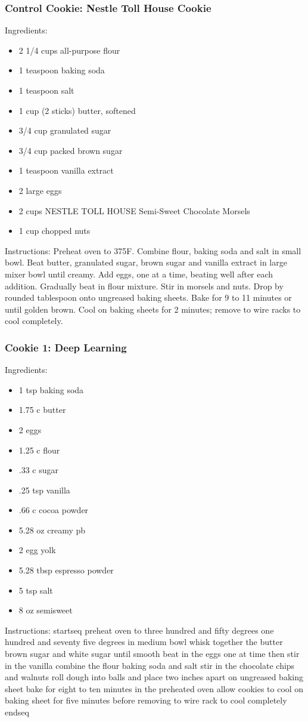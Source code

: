 \documentclass[11pt, a4paper]{article}
\begin{document}
		\subsubsection*{Control Cookie: Nestle\textsuperscript{\textregistered} Toll House\textsuperscript{\textregistered} Cookie}
		Ingredients:
			\begin{multicols}{2}
			\begin{itemize}
				\item2 1/4 cups all-purpose flour
				\item1 teaspoon baking soda
				\item1 teaspoon salt
				\item1 cup (2 sticks) butter, softened
				\item3/4 cup granulated sugar
				\item3/4 cup packed brown sugar
				\item1 teaspoon vanilla extract
				\item2 large eggs
				\item2 cups NESTLE\textsuperscript{\textregistered} TOLL HOUSE\textsuperscript{\textregistered}  Semi-Sweet Chocolate Morsels
				\item1 cup chopped nuts
			\end{itemize}
		\end{multicols}
		Instructions: Preheat oven to 375\textdegree F. Combine flour, baking soda and salt in small bowl. Beat butter, granulated sugar, brown sugar and vanilla extract in large mixer bowl until creamy. Add eggs, one at a time, beating well after each addition. Gradually beat in flour mixture. Stir in morsels and nuts. Drop by rounded tablespoon onto ungreased baking sheets. Bake for 9 to 11 minutes or until golden brown. Cool on baking sheets for 2 minutes; remove to wire racks to cool completely. 
		\subsubsection*{Cookie 1: Deep Learning}
		Ingredients:
		\begin{multicols}{2}
				\begin{itemize}
					\item1 tsp baking soda
					\item1.75 c butter
					\item2 eggs
					\item1.25 c flour
					\item .33 c sugar
					\item.25 tsp vanilla
					\item.66 c cocoa powder
					\item5.28 oz creamy pb
					\item2 egg yolk
					\item5.28 tbsp espresso powder
					\item5 tsp salt
					\item8 oz semisweet
			\end{itemize}
		\end{multicols}
		Instructions:
		startseq preheat oven to three hundred and fifty degrees one hundred and seventy five degrees in medium bowl whisk together the butter brown sugar and white sugar until smooth beat in the eggs one at time then stir in the vanilla combine the flour baking soda and salt stir in the chocolate chips and walnuts roll dough into balls and place two inches apart on ungreased baking sheet bake for eight to ten minutes in the preheated oven allow cookies to cool on baking sheet for five minutes before removing to wire rack to cool completely endseq
\end{document}

